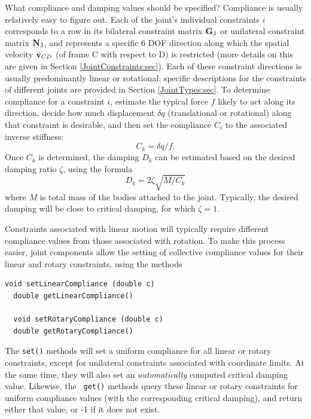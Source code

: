 What compliance and damping values should be specified? Compliance is
usually relatively easy to figure out. Each of the joint's individual
constraints $i$ corresponds to a row in its bilateral constraint matrix
${\bf G}_\text{J}$ or unilateral constraint matrix ${\bf N}_\text{J}$, and represents a
specific 6 DOF direction along which the spatial velocity
$\hat{{\bf v}}_{CD}$ (of frame C with respect to D) is restricted (more
details on this are given in Section \ref{JointConstraints:sec}).
Each of these constraint directions is usually predominantly linear or
rotational; specific descriptions for the constraints of different
joints are provided in Section \ref{JointTypes:sec}. To determine
compliance for a constraint $i$, estimate the typical force $f$ likely
to act along its direction, decide how much displacement $\delta q$
(translational or rotational) along that constraint is desirable, and
then set the compliance $C_i$ to the associated inverse stiffness:
%
\begin{equation}
C_k = \delta q/f.
\end{equation}
%
Once $C_k$ is determined, the damping $D_k$ can be estimated based on
the desired damping ratio $\zeta$, using the formula
%
\begin{equation}
D_k = 2 \zeta \sqrt{M/C_k}
\label{constraintDamping:eqn}
\end{equation}
%
where $M$ is total mass of the bodies attached to the joint.
Typically, the desired damping will be close to critical damping, for
which $\zeta = 1$.

Constraints associated with linear motion will typically require
different compliance values from those associated with rotation.  To
make this process easier, joint components allow the setting of
collective compliance values for their linear and rotary constraints,
using the methods
\begin{lstlisting}[]
  void setLinearCompliance (double c)
  double getLinearCompliance()

  void setRotaryCompliance (double c)
  double getRotaryCompliance()
\end{lstlisting}
%
The {\tt set()} methods will set a uniform compliance for all linear or
rotary constraints, except for unilateral constraints associated with
coordinate limits. At the same time, they will also set an {\it
automatically} computed critical damping value. Likewise, the {\tt
get()} methods query these linear or rotary constraints for uniform
compliance values (with the corresponding critical damping), and
return either that value, or -1 if it does not exist.

